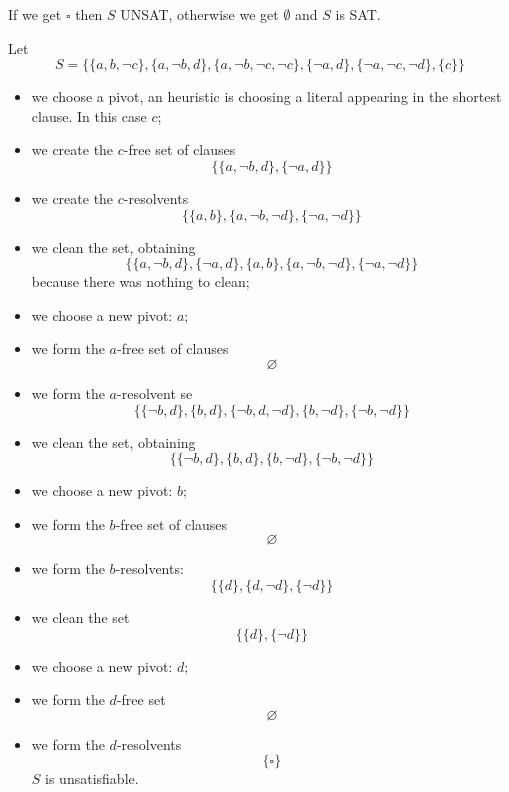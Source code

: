 If we get $\square$ then $S$ UNSAT, otherwise we get $\emptyset$ and $S$ is SAT.\\

\newpage

\begin{example}
	Let 
	$$S = \{\{a, b, \neg c\}, \{a, \neg b, d\}, \{a, \neg b, \neg c, \neg c\}, \{\neg a, d\}, \{\neg a, \neg c, \neg d\}, \{c\}\} $$
	\begin{itemize}
		\item we choose a pivot, an heuristic is choosing a literal appearing in the shortest clause.
		In this case $c$;
		\item we create the $c$-free set of clauses
		$$ \{\{a, \neg b, d\}, \{\neg a, d\}\} $$
		\item we create the $c$-resolvents
		$$ \{\{a, b\}, \{a, \neg b, \neg d\}, \{\neg a, \neg d\}\} $$
		\item we clean the set, obtaining
		$$ \{\{a, \neg b, d\}, \{\neg a, d\}, \{a, b\}, \{a, \neg b, \neg d\}, \{\neg a, \neg d\}\} $$
		because there was nothing to clean;
		\item we choose a new pivot: $a$;
		\item we form the $a$-free set of clauses
		$$ \varnothing $$
		\item we form the $a$-resolvent se 
		$$ \{\{\neg b, d\}, \{b, d\}, \{\neg b, d, \neg d\}, \{b, \neg d\}, \{\neg b, \neg d\}\} $$
		\item we clean the set, obtaining
		$$ \{\{\neg b, d\}, \{b, d\}, \{b, \neg d\}, \{\neg b, \neg d\}\} $$
		\item we choose a new pivot: $b$;
		\item we form the $b$-free set of clauses
		$$ \varnothing $$
		\item we form the $b$-resolvents:
		$$ \{\{d\}, \{d, \neg d\}, \{\neg d\} \} $$
		\item we clean the set
		$$ \{\{d\}, \{\neg d\} \} $$
		\item we choose a new pivot: $d$;
		\item we form the $d$-free set
		$$ \varnothing $$
		\item we form the $d$-resolvents
		$$ \{ \square \} $$
		$S$ is unsatisfiable.
	\end{itemize}
\end{example}

\newpage

